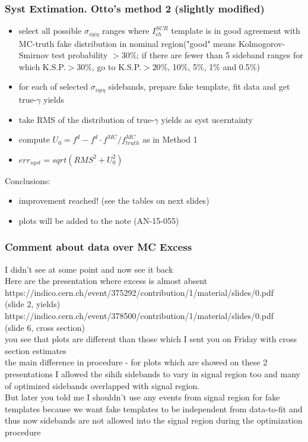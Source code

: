 \documentclass{beamer}
\begin{document}
\begin{frame}\frametitle{Syst Extimation. Otto's method 2 (slightly modified)}
    \scriptsize
    \begin{itemize}
      \item select all possible $\sigma_{i\eta{i}\eta}$ ranges where $I_{ch}^{SCR}$ template is in good agreement with MC-truth fake distribution in nominal region("good" means Kolmogorov-Smirnov test probability $ > 30\%$; if there are fewer than 5 sideband ranges for which K.S.P.$>30\%$, go to K.S.P.$>20\%$, 10\%, 5\%, 1\% and 0.5\%)  
      \item for each of selected $\sigma_{i\eta{i}\eta}$ sidebands, prepare fake template, fit data and get true-$\gamma$ yields   
      \item take RMS of the distribution of true-$\gamma$ yields as syst ucerntainty 
      \item compute $U_{0}=f^{d}-f^{d}{\cdot}f^{MC}/f^{MC}_{truth}$ as in Method 1
      \item $err_{syst}=sqrt(RMS^{2}+U_{0}^2)$
    \end{itemize}
    Conclusions:
    \begin{itemize}
      \item improvement reached! (see the tables on next slides)
      \item plots will be added to the note (AN-15-055)
    \end{itemize}
\end{frame}

\begin{frame}\frametitle{Comment about data over MC Excess}
\scriptsize
I didn't see at some point and now see it back\\

Here are the presentation where excess is almost absent\\

https://indico.cern.ch/event/375292/contribution/1/material/slides/0.pdf\\
(slide 2, yields)\\

https://indico.cern.ch/event/378500/contribution/1/material/slides/0.pdf\\
(slide 6, cross section)\\

you see that plots are different than those which I sent you on Friday with cross section estimates\\

the main difference in procedure - for plots which are showed on these 2 presentations I allowed the sihih sidebands to vary in signal region too and many of optimized sidebands overlapped with signal region.\\

But later you told me I shouldn't use any events from signal region for fake templates because we want fake templates to be independent from data-to-fit and thus now sidebands are not allowed into the signal region during the optimization procedure\\

\end{frame}
\end{document}
